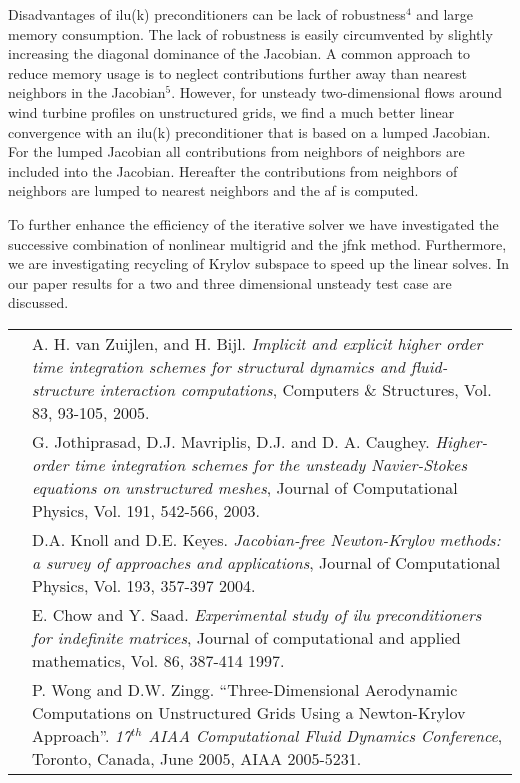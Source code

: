 \documentclass{report}
\begin{document}
Disadvantages of {\sc ilu}(k) preconditioners can be lack of
robustness$^4$ and large memory consumption. The lack of robustness is
easily circumvented by slightly increasing the diagonal dominance of the
Jacobian. A common approach to reduce memory usage is to neglect
contributions further away than nearest neighbors in the Jacobian$^5$.
However, for unsteady two-dimensional flows around wind turbine profiles
on unstructured grids, we find a much better linear convergence with an
{\sc ilu}(k) preconditioner that is based on a lumped Jacobian. For the
lumped Jacobian all contributions from neighbors of neighbors are
included into the Jacobian. Hereafter the contributions from neighbors of
neighbors are lumped to nearest neighbors and the {\sc af} is computed.

To further enhance the efficiency of the iterative solver we have
investigated the successive combination of nonlinear multigrid and the
{\sc jfnk} method. Furthermore, we are investigating recycling of Krylov
subspace to speed up the linear solves. In our paper results for a two
and three dimensional unsteady test case are discussed.

\vspace{1cm}

\begin{tabular}{lp{110mm}}
\hspace{-3mm}{[1]}&
A. H. van Zuijlen, and H. Bijl. {\em Implicit and explicit higher order
time integration schemes for structural dynamics and fluid-structure
interaction computations}, Computers $\&$ Structures, Vol. 83, 93-105,
2005.
\\[1mm]
\hspace{-3mm}{[2]}&
G. Jothiprasad, D.J. Mavriplis, D.J. and D. A. Caughey. {\em Higher-order
time integration schemes for the unsteady Navier-Stokes equations on
unstructured meshes}, Journal of Computational Physics, Vol. 191,
542-566, 2003.
\\[1mm]
\hspace{-3mm}{[3]}&
D.A. Knoll and D.E. Keyes. {\em Jacobian-free Newton-Krylov methods: a
survey of approaches and applications}, Journal of Computational Physics,
Vol. 193, 357-397 2004.
\\[1mm]
\hspace{-3mm}{[4]}&
E. Chow and Y. Saad. {\em Experimental study of ilu preconditioners for
indefinite matrices}, Journal of computational and applied mathematics,
Vol. 86, 387-414 1997.
\\[1mm]
\hspace{-3mm}{[5]}&
P. Wong and D.W. Zingg. ``Three-Dimensional Aerodynamic Computations on
Unstructured Grids Using a Newton-Krylov Approach''. {\em 17$^{th}$ AIAA
Computational Fluid Dynamics Conference}, Toronto, Canada, June 2005,
AIAA 2005-5231.
\\[1mm]

\end{tabular}
\end{document}
